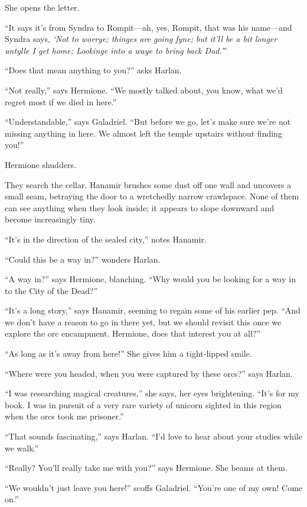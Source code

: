 \documentclass[smalldemyvopaper,11pt,twoside,onecolumn,openright,extrafontsizes]{memoir}
\begin{document}
She opens the letter.

``It says it's from Syndra to Rompit---ah, yes, Rompit, that was his
name---and Syndra says, \emph{`Not to worrye; thinges are going fyne;
but it'll be a bit longer untylle I get home; Lookinge into a waye to
bring back Dad.'}''

``Does that mean anything to you?'' asks Harlan.

``Not really,'' says Hermione. ``We mostly talked about, you know, what
we'd regret most if we died in here.''

``Understandable,'' says Galadriel. ``But before we go, let's make sure
we're not missing anything in here. We almost left the temple upstairs
without finding you!''

Hermione shudders.

They search the cellar. Hanamir brushes some dust off one wall and
uncovers a small seam, betraying the door to a wretchedly narrow
crawlspace. None of them can see anything when they look inside; it
appears to slope downward and become increasingly tiny.

``It's in the direction of the sealed city,'' notes Hanamir.

``Could this be a way in?'' wonders Harlan.

``A way in?'' says Hermione, blanching. ``Why would you be looking for a
way in to the City of the Dead?''

``It's a long story,'' says Hanamir, seeming to regain some of his
earlier pep. ``And we don't have a reason to go in there yet, but we
should revisit this once we explore the orc encampment. Hermione, does
that interest you at all?''

``As long as it's away from here!'' She gives him a tight-lipped smile.

``Where were you headed, when you were captured by these orcs?'' says
Harlan.

``I was researching magical creatures,'' she says, her eyes brightening.
``It's for my book. I was in pursuit of a very rare variety of unicorn
sighted in this region when the orcs took me prisoner.''

``That sounds fascinating,'' says Harlan. ``I'd love to hear about your
studies while we walk.''

``Really? You'll really take me with you?'' says Hermione. She beams at
them.

``We wouldn't just leave you here!'' scoffs Galadriel. ``You're one of
my own! Come on.''
\end{document}
